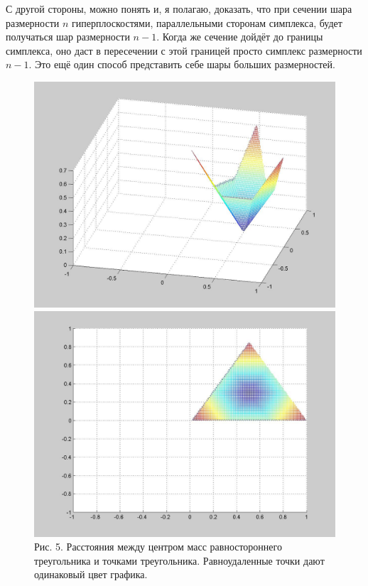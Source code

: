 \documentclass[12pt]{report}
\begin{document}
С другой стороны, можно понять и, я полагаю, доказать, что при сечении шара размерности $n$ гиперплоскостями, параллельными сторонам симплекса, будет получаться шар размерности $n - 1$. Когда же сечение дойдёт до границы симплекса, оно даст в пересечении с этой границей просто симплекс размерности $n-1$. Это ещё один способ представить себе шары больших размерностей.
\begin{figure}[!ht]
\begin{center}
\includegraphics[scale=0.2]{SimplexDists1}
\includegraphics[scale=0.2]{SimplexDists2}
\\Рис. 5. Расстояния между центром масс равностороннего треугольника и точками треугольника. Равноудаленные точки дают одинаковый цвет графика.
\end{center}
\end{figure}
\end{document}
